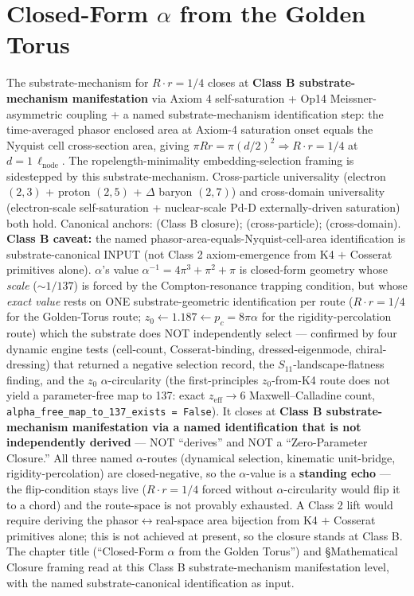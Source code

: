 \chapter{Closed-Form $\alpha$ from the Golden Torus}
\label{ch:alpha_golden_torus}

\noindent The substrate-mechanism for $R \cdot r = 1/4$ closes at \textbf{Class B substrate-mechanism manifestation} via Axiom 4 self-saturation + Op14 Meissner-asymmetric coupling + a named substrate-mechanism identification step: the time-averaged phasor enclosed area at Axiom-4 saturation onset equals the Nyquist cell cross-section area, giving $\pi R r = \pi (d/2)^2 \Rightarrow R \cdot r = 1/4$ at $d = 1\,\ell_\text{node}$. The ropelength-minimality embedding-selection framing is sidestepped by this substrate-mechanism. Cross-particle universality (electron $(2,3)$ + proton $(2,5)$ + $\Delta$ baryon $(2,7)$) and cross-domain universality (electron-scale self-saturation + nuclear-scale Pd-D externally-driven saturation) both hold. Canonical anchors:  (Class B closure);  (cross-particle);  (cross-domain). \textbf{Class B caveat:} the named phasor-area-equals-Nyquist-cell-area identification is substrate-canonical INPUT (not Class 2 axiom-emergence from K4 $+$ Cosserat primitives alone). $\alpha$'s value $\alpha^{-1} = 4\pi^3 + \pi^2 + \pi$ is closed-form geometry whose \emph{scale} ($\sim 1/137$) is forced by the Compton-resonance trapping condition, but whose \emph{exact value} rests on ONE substrate-geometric identification per route ($R \cdot r = 1/4$ for the Golden-Torus route; $z_0 \leftarrow 1.187 \leftarrow p_c = 8\pi\alpha$ for the rigidity-percolation route) which the substrate does NOT independently select --- confirmed by four dynamic engine tests (cell-count, Cosserat-binding, dressed-eigenmode, chiral-dressing) that returned a negative selection record, the $S_{11}$-landscape-flatness finding, and the $z_0$ $\alpha$-circularity (the first-principles $z_0$-from-K4 route does not yield a parameter-free map to 137: exact $z_{\text{eff}} \to 6$ Maxwell--Calladine count, \texttt{alpha\_free\_map\_to\_137\_exists = False}).
It closes at \textbf{Class B substrate-mechanism manifestation via a named identification that is not independently derived} --- NOT ``derives'' and NOT a ``Zero-Parameter Closure.'' All three named $\alpha$-routes (dynamical selection, kinematic unit-bridge, rigidity-percolation) are closed-negative, so the $\alpha$-value is a \textbf{standing echo} --- the flip-condition stays live ($R \cdot r = 1/4$ forced without $\alpha$-circularity would flip it to a chord) and the route-space is not provably exhausted. A Class 2 lift would require deriving the phasor$\leftrightarrow$real-space area bijection from K4 $+$ Cosserat primitives alone; this is not achieved at present, so the closure stands at Class B. The chapter title (``Closed-Form $\alpha$ from the Golden Torus'') and \S Mathematical Closure framing read at this Class B substrate-mechanism manifestation level, with the named substrate-canonical identification as input.


